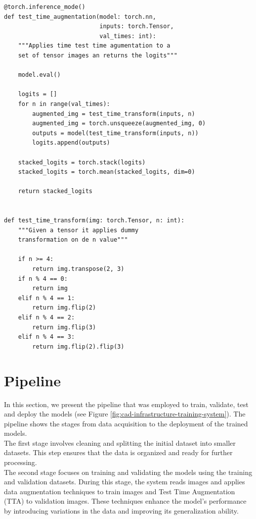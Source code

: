 \begin{Verbatim}[fontsize=\scriptsize]
@torch.inference_mode()
def test_time_augmentation(model: torch.nn,
                           inputs: torch.Tensor,
                           val_times: int):
    """Applies time test time agumentation to a
    set of tensor images an returns the logits"""

    model.eval()

    logits = []
    for n in range(val_times):
        augmented_img = test_time_transform(inputs, n)
        augmented_img = torch.unsqueeze(augmented_img, 0)
        outputs = model(test_time_transform(inputs, n))
        logits.append(outputs)

    stacked_logits = torch.stack(logits)
    stacked_logits = torch.mean(stacked_logits, dim=0)

    return stacked_logits


def test_time_transform(img: torch.Tensor, n: int):
    """Given a tensor it applies dummy
    transformation on de n value"""

    if n >= 4:
        return img.transpose(2, 3)
    if n % 4 == 0:
        return img
    elif n % 4 == 1:
        return img.flip(2)
    elif n % 4 == 2:
        return img.flip(3)
    elif n % 4 == 3:
        return img.flip(2).flip(3)
\end{Verbatim}

\section{Pipeline}

In this section, we present the pipeline that was employed to train, validate,
test and deploy the models (see Figure
\ref{fig:cad-infrastructure-training-system}). The pipeline shows the stages
from data acquisition to the deployment of the trained models. \\

The first stage involves cleaning and splitting the initial dataset into
smaller datasets. This step ensures that the data is organized and ready for
further processing. \\

The second stage focuses on training and validating the models using the
training and validation datasets. During this stage, the system reads images
and applies data augmentation techniques to train images and Test Time
Augmentation (TTA) to validation images. These techniques enhance the model's
performance by introducing variations in the data and improving its
generalization ability. \\

